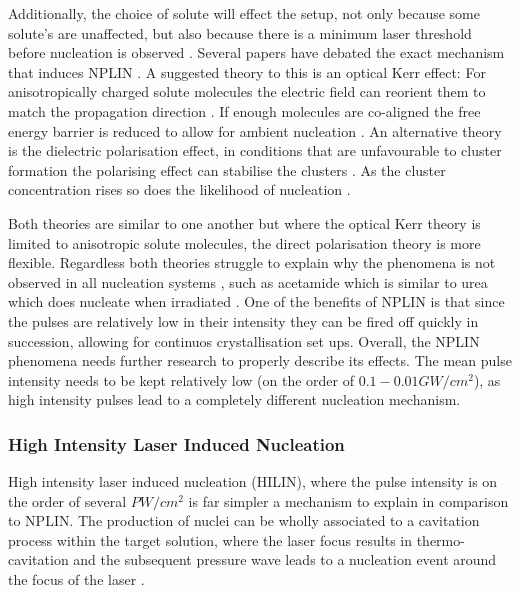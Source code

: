 Additionally, the choice of solute will effect the setup, not 
only because some solute's are unaffected, but also because 
there is a minimum laser threshold before nucleation is observed 
\cite{Garetz2002}. Several papers have debated the exact mechanism 
that induces NPLIN \cite{Garetz2002, Knott2011}. A suggested 
theory to this is an optical Kerr effect: For anisotropically 
charged solute molecules the electric field can reorient them 
to match the propagation direction \cite{Garetz2002}. If enough 
molecules are co-aligned the free energy barrier is reduced to 
allow for ambient nucleation \cite{Knott2011}. An alternative 
theory is the dielectric polarisation effect, in conditions that 
are unfavourable to cluster formation the polarising effect can 
stabilise the clusters \cite{Alexander2008}. As the cluster 
concentration rises so does the likelihood of nucleation 
\cite{Vekilov2010}. 

Both theories are similar to one another but where the optical 
Kerr theory is limited to anisotropic solute molecules, the 
direct polarisation theory is more flexible. Regardless both 
theories struggle to explain why the phenomena is not observed 
in all nucleation systems \cite{Korede2023}, such as acetamide 
which is similar to urea which does nucleate when irradiated 
\cite{Ward2016}. One of the benefits of NPLIN is that since the 
pulses are relatively low in their intensity they can be fired 
off quickly in succession, allowing for continuos crystallisation 
set ups. Overall, the NPLIN phenomena needs further research to 
properly describe its effects. The mean pulse intensity needs to 
be kept relatively low (on the order of $0.1-0.01 GW/cm^2$), as 
high intensity pulses lead to a completely different nucleation 
mechanism.

\subsubsection{High Intensity Laser Induced Nucleation}
High intensity laser induced nucleation (HILIN), where the pulse 
intensity is on the order of several $PW/cm^2$ is far simpler a 
mechanism to explain in comparison to NPLIN. The production of 
nuclei can be wholly associated to a cavitation process within 
the target solution, where the laser focus results in thermo-
cavitation and the subsequent pressure wave leads to a nucleation 
event around the focus of the laser \cite{Yoshikawa2005, Soare2011, 
	Barber2019}. 

